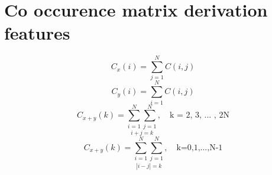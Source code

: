 \chapter{Co occurence matrix derivation features}

\[
C_x(i) = \sum_{j=1}^{N}C(i,j)
\]
\[
C_y(i) = \sum_{i=1}^{N}C(i,j)
\]
\[
C_{x+y}(k) = \underset{i+j=k}{\sum_{i=1}^{N}\sum_{j=1}^{N}}, \quad \text{k = 2, 3, ... , 2N}
\]
\[
C_{x+y}(k) = \underset{|i-j|=k}{\sum_{i=1}^{N}\sum_{j=1}^{N}}, \quad \text{k=0,1,...,N-1}
\]